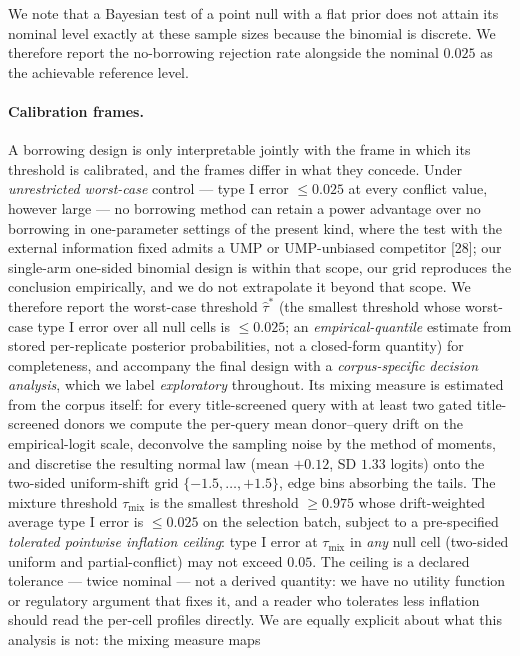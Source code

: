 \documentclass[11pt]{article}
\begin{document}
We note that a Bayesian test of a point null with a flat prior does not attain
its nominal level exactly at these sample sizes because the binomial is
discrete. We therefore report the no-borrowing rejection rate alongside the
nominal $0.025$ as the achievable reference level.

\paragraph{Calibration frames.} A borrowing design is only interpretable
jointly with the frame in which its threshold is calibrated, and the frames
differ in what they concede. Under \emph{unrestricted worst-case} control ---
type I error $\le 0.025$ at every conflict value, however large --- no
borrowing method can retain a power advantage over no borrowing in
one-parameter settings of the present kind, where the test with the
external information fixed admits a UMP or UMP-unbiased competitor [28];
our single-arm one-sided binomial design is within that scope, our grid
reproduces the conclusion empirically, and we do not extrapolate it beyond
that scope. We therefore report the worst-case threshold
$\hat\tau^{*}$ (the smallest threshold whose worst-case type I error over
all null cells is $\le 0.025$; an \emph{empirical-quantile} estimate from
stored per-replicate posterior probabilities, not a closed-form quantity)
for completeness, and accompany the final design with a
\emph{corpus-specific decision analysis}, which we label
\emph{exploratory} throughout. Its
mixing measure is estimated from the corpus itself: for every title-screened
query with at least two gated title-screened donors we compute the per-query
mean donor--query drift on the empirical-logit scale, deconvolve the
sampling noise by the method of moments, and discretise the resulting normal
law (mean $+0.12$, SD $1.33$ logits) onto the two-sided uniform-shift grid
$\{-1.5, \dots, +1.5\}$, edge bins absorbing the tails. The mixture
threshold $\tau_{\mathrm{mix}}$ is the smallest threshold $\ge 0.975$ whose
drift-weighted average type I error is $\le 0.025$ on the selection batch,
subject to a pre-specified \emph{tolerated pointwise inflation ceiling}:
type I error at $\tau_{\mathrm{mix}}$ in \emph{any} null cell (two-sided
uniform and partial-conflict) may not exceed $0.05$. The ceiling is a
declared tolerance --- twice nominal --- not a derived quantity: we have no
utility function or regulatory argument that fixes it, and a reader who
tolerates less inflation should read the per-cell profiles directly. We are
equally explicit about what this analysis is not: the mixing measure maps
\end{document}
